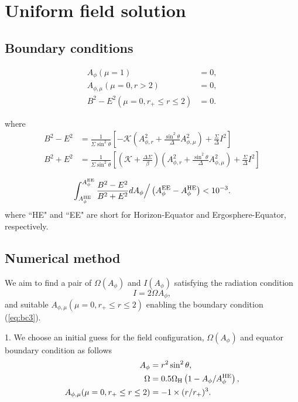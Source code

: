 \documentclass[aps,prd,reprint,nofootinbib, superscriptaddress]{revtex4-1}
\def\sst{\sin^2\theta}
\def\Ap{A_\phi}
\def\Ar{A_{\phi,r}}
\def\Am{A_{\phi,\mu}}
\def\be{\begin{equation}}
\def\ee{\end{equation}}
\def\WH{\Omega_{\rm H}}
\def\AHE{A_\phi^{\rm HE}}
\begin{document}
\section{Uniform field solution}

\subsection{Boundary conditions}

\begin{subequations}
\begin{align}
    A_\phi(\mu = 1) &= 0,  \label{eq:bc1}\\
    \Am(\mu = 0, r > 2) &= 0, \label{eq:bc2}\\
    B^2-E^2 (\mu = 0, r_+ \leq r \leq 2) &=0.\label{eq:bc3}
\end{align}
\end{subequations}

where
\be
\begin{aligned}
B^2-E^2 &= \frac{1}{\Sigma \sst} \left[ -\mathcal{K} \left(\Ar^2 +\frac{\sst}{\Delta}\Am^2 \right)+\frac{\Sigma}{\Delta}I^2\right]\\
B^2+E^2 &= \frac{1}{\Sigma \sst} \left[ \left(\mathcal{K}+\frac{\Delta\Sigma}{\beta} \right) \left(\Ar^2 +\frac{\sst}{\Delta}\Am^2 \right)+\frac{\Sigma}{\Delta}I^2\right]\\
\end{aligned}
\ee
\be
\label{eq:nbc}
\int_{A_\phi^{\rm HE}}^{A_\phi^{\rm EE}} \frac{B^2-E^2}{B^2+E^2} dA_\phi \Big/ \left(A_\phi^{\rm EE}- A_\phi^{\rm HE}\right)  < 10^{-3}.
\ee
where ``HE" and ``EE" are short for Horizon-Equator and Ergosphere-Equator, respectively.

\subsection{Numerical method}
We aim to find a pair of $\Omega(A_\phi)$ and $I(A_\phi)$ satisfying the radiation condition
\be I = 2\Omega A_\phi, \label{eq:rad}\ee
and suitable $\Am(\mu =0, r_+\leq r \leq 2)$
enabling the boundary condition (\ref{eq:bc3}).

1. We choose an initial guess for the field configuration, $\Omega(\Ap)$ and equator boundary condition as follows
\begin{subequations}
\begin{align}
    \Ap &= r^2 \sst,  \label{eq:gss1} \\
    \Omega & = 0.5\WH\left(1-\Ap/\AHE\right), \label{eq:gss2}\\
    \Am(\mu =0, r_+\leq r \leq 2) & = -1\times (r/r_+)^3. \label{eq:gss3}
\end{align}
\end{subequations}
\end{document}
